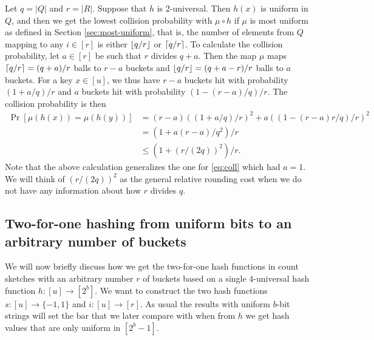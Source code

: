 Let $q=|Q|$ and $r=|R|$.
Suppose that $h$ is $2$-universal.
Then $h(x)$ is uniform in $Q$, and then we get the lowest collision probability with $\mu\circ h$ if $\mu$ is most uniform as defined in Section \ref{sec:most-uniform}, that is, the number of elements from $Q$ mapping to any $i\in[r]$ is either $\lfloor {q/r} \rfloor$ or $\lceil {q/r}\rceil$.
To calculate the collision probability, let $a\in[r]$ be such that $r$ divides $q+a$.
Then the map $\mu$ maps $\lceil {q/r}\rceil=(q+a)/r$ balls to $r-a$ buckets and $\lfloor {q/r} \rfloor=(q+a-r)/r$ balls to $a$ buckets.
For a key $x\in [u]$, we thus have $r-a$ buckets hit with probability $(1+a/q)/r$ and $a$ buckets hit with probability $(1-(r-a)/q)/r$.
The collision probability is then
\begin{equation}
   \begin{split}
      \Pr[\mu(h(x))=\mu(h(y))] &= (r-a)((1+a/q)/r)^2+a((1-(r-a)r/q)/r)^2   \\&=(1+a(r-a)/q^2)/r \\&\le \left(1+(r/(2q))^2\right)/r.
      \label{eq:coll-a}
   \end{split}
\end{equation}
Note that the above calculation generalizes the one for \eqref{eq:coll} which had $a=1$.
We will think of $(r/(2q))^2$ as the general relative rounding cost when we do not have any information about how $r$ divides $q$.

\subsection{Two-for-one hashing from uniform bits to an arbitrary number of buckets}
We will now briefly discuss how we get the two-for-one hash functions in count sketches with an arbitrary number $r$ of buckets based on a single $4$-universal hash function $h:[u]\to [2^b]$.
We want to construct the two hash functions $s:[u]\to\{-1,1\}$ and $i:[u]\to[r]$.
As usual the results with uniform $b$-bit strings will set the bar that we later compare with when from $h$ we get hash values that are only uniform in $[2^b-1]$.

